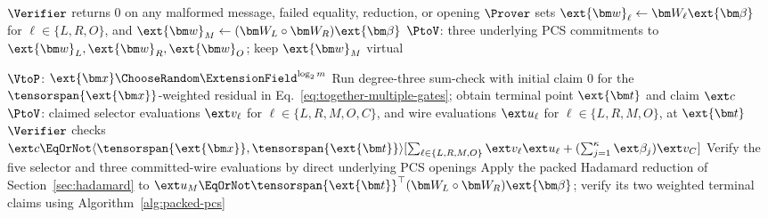 \begin{algorithm}[!t]
\footnotesize
\caption{PLONK proof with packing across instances of the same circuit}
\label{alg:multiple-instance-packing}

\(\Verifier\) returns \(0\) on any malformed message,
failed equality, reduction, or opening\;
\(\Prover\) sets
\(\ext{\bm w}_\ell\leftarrow\bm W_\ell\ext{\bm\beta}\)
for \(\ell\in\{L,R,O\}\), and
\(\ext{\bm w}_M\leftarrow
(\bm W_L\circ\bm W_R)\ext{\bm\beta}\)\;
\(\PtoV\): three underlying PCS commitments to
\(\ext{\bm w}_L,\ext{\bm w}_R,\ext{\bm w}_O\);
keep \(\ext{\bm w}_M\) virtual\;

\(\VtoP\): \(\ext{\bm x}\ChooseRandom
\ExtensionField^{\log_2m}\)\;
Run degree-three sum-check with initial claim \(0\) for the
\(\tensorspan{\ext{\bm x}}\)-weighted residual in
Eq.~\eqref{eq:together-multiple-gates};
obtain terminal point \(\ext{\bm t}\) and claim \(\ext c\)\;
\(\PtoV\): claimed selector evaluations \(\ext v_\ell\)
for \(\ell\in\{L,R,M,O,C\}\), and wire evaluations
\(\ext u_\ell\) for \(\ell\in\{L,R,M,O\}\), at \(\ext{\bm t}\)\;
\(\Verifier\) checks
\(\ext c\EqOrNot
\langle\tensorspan{\ext{\bm x}},\tensorspan{\ext{\bm t}}\rangle
[\sum_{\ell\in\{L,R,M,O\}}\ext v_\ell\ext u_\ell+
(\sum_{j=1}^{\kappa}\ext\beta_j)\ext v_C]\)\;
Verify the five selector and three committed-wire evaluations
by direct underlying PCS openings\;
Apply the packed Hadamard reduction of Section~\ref{sec:hadamard}
to
\(\ext u_M\EqOrNot
\tensorspan{\ext{\bm t}}^\top
(\bm W_L\circ\bm W_R)\ext{\bm\beta}\);
verify its two weighted terminal claims using
Algorithm~\ref{alg:packed-pcs}\;


\end{algorithm}
